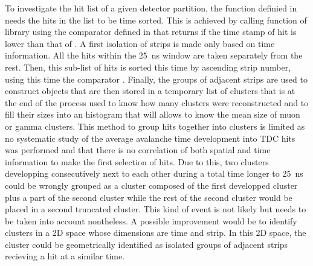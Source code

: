 	To investigate the hit list of a given detector partition, the function  definied in  needs the hits in the list to be time sorted. This is achieved by calling function  of library  using the comparator  defined in  that returns  if the time stamp of hit  is lower than that of . A first isolation of strips is made only based on time information. All the hits within the \SI{25}{ns} window are taken separately from the rest. Then, this sub-list of hits is sorted this time by ascending strip number, using this time the comparator . Finally, the groups of adjacent strips are used to construct  objects that are then stored in a temporary list of clusters that is at the end of the process used to know how many clusters were reconstructed and to fill their sizes into an histogram that will allows to know the mean size of muon or gamma clusters.  This method to group hits together into clusters is limited as no systematic study of the average avalanche time development into TDC hits was performed and that there is no correlation of both spatial and time information to make the first selection of hits. Due to this, two clusters developping consecutively next to each other during a total time longer to \SI{25}{ns} could be wrongly grouped as a cluster composed of the first developped cluster plus a part of the second cluster while the rest of the second cluster would be placed in a second truncated cluster. This kind of event is not likely but needs to be taken into account nontheless. A possible improvement would be to identify clusters in a 2D space whose dimensions are time and strip. In this 2D space, the cluster could be geometrically identified as isolated groups of adjacent strips recieving a hit at a similar time.\\
	
